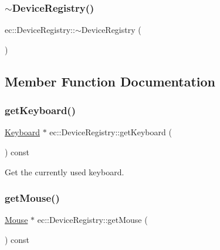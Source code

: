 \subsubsection{\texorpdfstring{$\sim$\+Device\+Registry()}{~DeviceRegistry()}}
{\footnotesize\ttfamily ec\+::\+Device\+Registry\+::$\sim$\+Device\+Registry (\begin{DoxyParamCaption}{ }\end{DoxyParamCaption})\hspace{0.3cm}{\ttfamily [default]}}



\subsection{Member Function Documentation}
\mbox{\label{classec_1_1_device_registry_aabbeda3bb4977e230b974c92b6048027}} 
\subsubsection{\texorpdfstring{get\+Keyboard()}{getKeyboard()}}
{\footnotesize\ttfamily \mbox{\hyperlink{classec_1_1_keyboard}{Keyboard}} $\ast$ ec\+::\+Device\+Registry\+::get\+Keyboard (\begin{DoxyParamCaption}{ }\end{DoxyParamCaption}) const}



Get the currently used keyboard. 

\mbox{\label{classec_1_1_device_registry_a53b0c5d23c851c63ef97529658cd126d}} 
\subsubsection{\texorpdfstring{get\+Mouse()}{getMouse()}}
{\footnotesize\ttfamily \mbox{\hyperlink{classec_1_1_mouse}{Mouse}} $\ast$ ec\+::\+Device\+Registry\+::get\+Mouse (\begin{DoxyParamCaption}{ }\end{DoxyParamCaption}) const}




